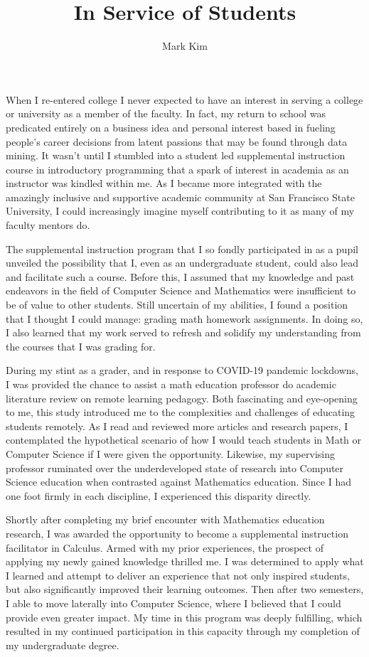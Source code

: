 \documentclass[12pt]{article}
\title{In Service of Students}
\author{Mark Kim}
\begin{document}
\maketitle

When I re-entered college I never expected to have an interest in serving a
college or university as a member of the faculty.  In fact, my return to school was
predicated entirely on a business idea and personal interest based in fueling
people's career decisions from latent passions that may be found through data
mining.  It wasn't until I stumbled into a student led supplemental instruction
course in introductory programming that a spark of interest in academia as an
instructor was kindled within me.  As I became more integrated with the
amazingly inclusive and supportive academic community at San Francisco State
University, I could increasingly imagine myself contributing to it as many of my
faculty mentors do.

The supplemental instruction program that I so fondly participated in as a
pupil unveiled the possibility that I, even as an undergraduate student, could
also lead and facilitate such a course.  Before this, I assumed that my
knowledge and past endeavors in the field of Computer Science and Mathematics were
insufficient to be of value to other students.  Still uncertain of my abilities,
I found a position that I thought I could manage: grading math homework
assignments.  In doing so, I also learned that my work served to refresh and
solidify my understanding from the courses that I was grading for.

During my stint as a grader, and in response to COVID-19 pandemic lockdowns, I
was provided the chance to assist a math education professor do academic
literature review on remote learning pedagogy.  Both fascinating and eye-opening
to me, this study introduced me to the complexities and challenges of
educating students remotely.  As I read and reviewed more articles and research
papers, I contemplated the hypothetical scenario of how I would teach students
in Math or Computer Science if I were given the opportunity.  Likewise, my
supervising professor ruminated over the underdeveloped state of research into
Computer Science education when contrasted against Mathematics education.  Since
I had one foot firmly in each discipline, I experienced this disparity directly.

Shortly after completing my brief encounter with Mathematics education research,
I was awarded the opportunity to become a supplemental instruction facilitator
in Calculus.  Armed with my prior experiences, the prospect of applying my newly
gained knowledge thrilled me.  I was determined to apply what I learned and attempt to
deliver an experience that not only inspired students, but also significantly
improved their learning outcomes.  Then after two semesters, I able to move
laterally into Computer Science, where I believed that I could provide even greater
impact.  My time in this program was deeply fulfilling, which
resulted in my continued participation in this capacity through my completion of
my undergraduate degree.
\end{document}
